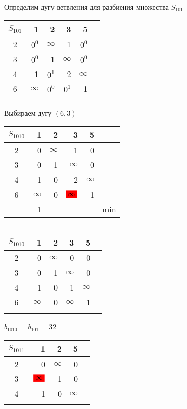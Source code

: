 \documentclass[12pt]{article}
\begin{document}
Определим дугу ветвления для разбиения множества $S_{101}$\\

\begin{flushleft}
\begin{tabular}{c||rrrr||c}
$S_{101}$ & 1 & 2 & 3 & 5 &  \\
\hline
\hline
2 & $0^0$ & $\infty$ & 1  & $0^0$ &  \\
3 & $0^0$ & 1 & $\infty$  & $0^0$ &  \\
4 & 1 & $0^1$ & 2  & $\infty$ &  \\
6 & $\infty$ & $0^0$ & $0^1$  & 1 &  \\
\hline
\hline
 &  &    &  & \\
\end{tabular}
\end{flushleft}

Выбираем дугу $(6,3)$

\begin{flushleft}
\begin{tabular}{c||rrrr||c}
$S_{1010}$ & 1 & 2 & 3 & 5 &  \\
\hline
\hline
2 & 0 & $\infty$ & 1  & 0 &  \\
3 & 0 & 1 & $\infty$  & 0 &  \\
4 & 1 & 0 & 2  & $\infty$ &  \\
6 & $\infty$ & 0 & $\colorbox{red}{$\infty$}$ & 1 &  \\
\hline
\hline
  &  1&  &  & &min \\
\end{tabular}
$\qquad $ 
\begin{tabular}{c||rrrr||c}
$S_{1010}$ & 1 & 2 & 3 & 5 &  \\
\hline
\hline
2 & 0 & $\infty$ & 0         & 0 &  \\
3 & 0 &        1 & $\infty$  & 0 &  \\
4 & 1 &        0 & 1         & $\infty$ &  \\
6 & $\infty$ & 0 & $\infty$  & 1 &  \\
\hline
\hline
     &  &  &  & \\
\end{tabular}
\end{flushleft}

$b_{1010}$ = $b_{101}$  = 32\\

\begin{flushleft}
\begin{tabular}{c||rrr||c}
$S_{1011}$ & 1 & 2  & 5 &  \\
\hline
\hline
2 & 0 & $\infty$   & 0 &  \\
3 & $\colorbox{red}{$\infty$}$ & 1   & 0 &  \\
4 & 1 & 0   & $\infty$ &  \\
\hline
\hline
  &  &  & \\
\end{tabular}
\end{flushleft}
\end{document}
